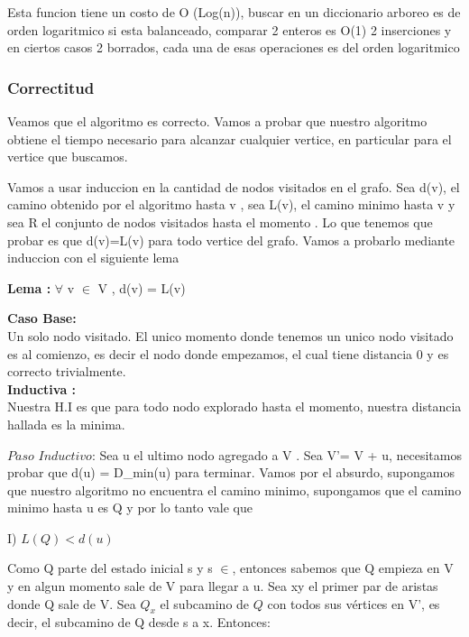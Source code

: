 Esta funcion tiene un costo de O (Log(n)), buscar en un diccionario arboreo es de orden logaritmico si esta balanceado, comparar 2 enteros es O(1) 2 inserciones
y en ciertos casos 2 borrados, cada una de esas operaciones es del orden logaritmico


	\subsubsection{Correctitud}

Veamos que el algoritmo es correcto. Vamos a probar que nuestro algoritmo
obtiene el tiempo necesario para alcanzar cualquier vertice, en particular
para el vertice que buscamos.

Vamos a usar induccion en la cantidad de nodos visitados en el grafo.
Sea d(v), el camino obtenido por el algoritmo hasta v , sea L(v), el camino minimo hasta v y sea R el conjunto de nodos visitados hasta el momento . Lo que tenemos que probar es que d(v)=L(v) para todo vertice del grafo. Vamos a probarlo mediante induccion con el siguiente lema
\\


\begin{center}
\textbf{Lema :} $\forall$ v $\in$ V , d(v) = L(v)
\end{center}

\textbf{Caso Base:}
\\

Un solo nodo visitado. El unico momento donde tenemos un unico nodo visitado es al comienzo, es decir
el nodo donde empezamos, el cual tiene distancia 0 y es correcto trivialmente.
\\

\textbf{ Inductiva :}
\\

Nuestra H.I es que para todo nodo explorado hasta el momento, nuestra distancia
hallada es la minima.

$Paso$ $Inductivo$:
Sea u el ultimo nodo agregado a V . Sea V'= V + u, necesitamos probar que d(u) = D_min(u) para terminar.
Vamos por el absurdo, supongamos que nuestro algoritmo no encuentra el camino minimo,
supongamos que el camino minimo hasta u es Q y por lo tanto vale que

I) $L(Q) < d(u)$

Como Q parte del estado inicial s y s $\in$, entonces sabemos que Q empieza en V y en algun momento sale de V para llegar a u. Sea xy el primer par de aristas donde Q sale de V. Sea $Q_x$ el subcamino de $Q$ con todos sus vértices en V', es decir, el subcamino de Q desde s a x. Entonces:

